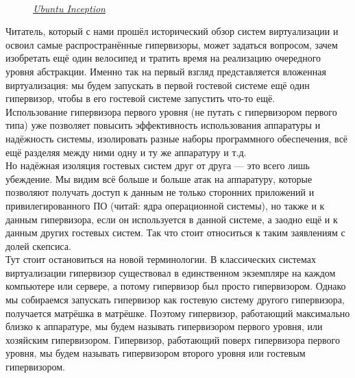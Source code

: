 \documentclass[14pt, a4paper]{article}
\begin{document}
\begin{figure}[h]
    \centering
    \\
    \small\textit{\href{https://tchubirabiron.wordpress.com/}{Ubuntu Inception}}
    \label{framework} 
\end{figure}

Читатель, который с нами прошёл исторический обзор систем виртуализации и освоил самые
распространённые гипервизоры, может задаться вопросом, зачем изобретать ещё один велосипед и
тратить время на реализацию очередного уровня абстракции. Именно так на первый взгляд
представляется вложенная виртуализация: мы будем запускать в первой гостевой системе ещё один
гипервизор, чтобы в его гостевой системе запустить что-то ещё.\\

Использование гипервизора первого уровня (не путать с гипервизором первого типа) уже позволяет
повысить эффективность использования аппаратуры и надёжность системы, изолировать разные
наборы программного обеспечения, всё ещё разделяя между ними одну и ту же аппаратуру и т.д.\\

Но надёжная изоляция гостевых систем друг от друга — это всего лишь убеждение. Мы видим всё
больше и больше атак на аппаратуру, которые позволяют получать доступ к данным не только
сторонних приложений и привилегированного ПО (читай: ядра операционной системы), но также и к
данным гипервизора, если он используется в данной системе, а заодно ещё и к данным других
гостевых систем. Так что стоит относиться к таким заявлениям с долей скепсиса.\\

Тут стоит остановиться на новой терминологии. В классических системах виртуализации гипервизор
существовал в единственном экземпляре на каждом компьютере или сервере, а потому гипервизор
был просто гипервизором. Однако мы собираемся запускать гипервизор как гостевую систему другого
гипервизора, получается матрёшка в матрёшке. Поэтому гипервизор, работающий максимально
близко к аппаратуре, мы будем называть гипервизором первого уровня, или хозяйским гипервизором.
Гипервизор, работающий поверх гипервизора первого уровня, мы будем называть гипервизором
второго уровня или гостевым гипервизором.

\begin{figure}[h]
    \centering
    \label{framework} 
\end{figure}
\end{document}
